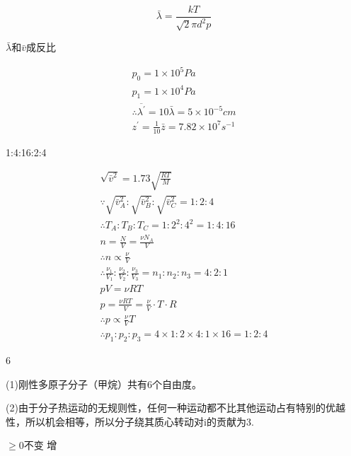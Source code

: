 \documentclass[b5paper,opensource]{./template/qyxf-book}
\begin{document}
\solve

$$
\bar { \lambda } = \frac { k T } { \sqrt { 2 } \pi d ^ { 2 } p }
$$

$\bar { \lambda } $和$\bar { v } $成反比

$$
\begin{array} { l } { p _ { 0 } = 1 \times 10 ^ { 5 } P a } \\ { p _ { 1 } = 1 \times 10 ^ { 4 } P a } \\ { \therefore \overline { \lambda ^ { \prime } } = 10 \bar { \lambda } = 5 \times 10 ^ { - 5 } c m } \\ { z ^ { \prime } = \frac { 1 } { 10 } \bar { z } = 7.82 \times 10 ^ { 7 } s ^ { - 1 } } \end{array}
$$

 1:4:16:2:4

\solve

$$
\begin{array}{*{20}{c}} \sqrt { \bar { v } ^ { 2 } } = 1.73 \sqrt { \frac { R T } { M } } \\ \because \sqrt { \bar { v } _ { A } ^ { 2 } } : \sqrt { \bar { v } _ { B } ^ { 2 } }  : \sqrt { \bar { v } _ { C } ^ { 2 } } = 1 : 2 : 4 \\ \therefore T _ { A } : T _ { B } : T _ { C } = 1 : 2 ^ { 2 } : 4 ^ { 2 } = 1 : 4 : 16 \\ n = \frac { N } { V } = \frac { \nu N _ { A } } { V } \\ \therefore n \propto \frac { \nu } { V }\\ \therefore \frac { \nu _ { 1 } } { V _ { 1 } } : \frac { \nu _ { 2 } } { V _ { 2 } } : \frac { \nu _ { 3 } } { V _ { 3 } }  = n _ { 1 } : n _ { 2 } : n _ { 3 } = 4 : 2 : 1 \\ p V  = \nu R T \\ p = \frac { \nu R T } { V }  = \frac { \nu } { V } \cdot T \cdot R \\ \therefore p  \propto \frac { \nu } { V } T \\ \therefore p _ { 1 } : p _ { 2 } : p _ { 3 } = 4 \times 1 : 2 \times 4 : 1 \times 16 = 1 : 2 : 4  \end{array}
$$

6

\solve (1)刚性多原子分子（甲烷）共有6个自由度。

(2)由于分子热运动的无规则性，任何一种运动都不比其他运动占有特别的优越性，所以机会相等，所以分子绕其质心转动对i的贡献为3.

$
\geqslant 0 
$\qquad 不变 \qquad 增
\end{document}
